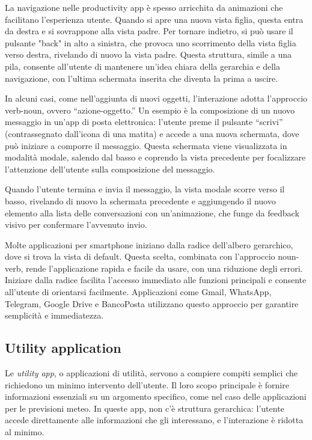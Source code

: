 La navigazione nelle productivity app è spesso arricchita da animazioni che facilitano l’esperienza utente. Quando si apre una nuova vista figlia, questa entra da destra e si sovrappone alla vista padre. Per tornare indietro, si può usare il pulsante "back" in alto a sinistra, che provoca uno scorrimento della vista figlia verso destra, rivelando di nuovo la vista padre. Questa struttura, simile a una pila, consente all’utente di mantenere un’idea chiara della gerarchia e della navigazione, con l’ultima schermata inserita che diventa la prima a uscire.

In alcuni casi, come nell’aggiunta di nuovi oggetti, l’interazione adotta l’approccio verb-noun, ovvero “azione-oggetto.” Un esempio è la composizione di un nuovo messaggio in un’app di posta elettronica: l’utente preme il pulsante “scrivi” (contrassegnato dall’icona di una matita) e accede a una nuova schermata, dove può iniziare a comporre il messaggio. Questa schermata viene visualizzata in modalità modale, salendo dal basso e coprendo la vista precedente per focalizzare l’attenzione dell’utente sulla composizione del messaggio.

Quando l’utente termina e invia il messaggio, la vista modale scorre verso il basso, rivelando di nuovo la schermata precedente e aggiungendo il nuovo elemento alla lista delle conversazioni con un’animazione, che funge da feedback visivo per confermare l’avvenuto invio.

Molte applicazioni per smartphone iniziano dalla radice dell’albero gerarchico, dove si trova la vista di default. Questa scelta, combinata con l’approccio noun-verb, rende l’applicazione rapida e facile da usare, con una riduzione degli errori. Iniziare dalla radice facilita l’accesso immediato alle funzioni principali e consente all’utente di orientarsi facilmente. Applicazioni come Gmail, WhatsApp, Telegram, Google Drive e BancoPosta utilizzano questo approccio per garantire semplicità e immediatezza.

\subsection{Utility application}
Le \textit{utility app}, o applicazioni di utilità, servono a compiere compiti semplici che richiedono un minimo intervento dell’utente. Il loro scopo principale è fornire informazioni essenziali su un argomento specifico, come nel caso delle applicazioni per le previsioni meteo. In queste app, non c’è struttura gerarchica: l’utente accede direttamente alle informazioni che gli interessano, e l’interazione è ridotta al minimo.

